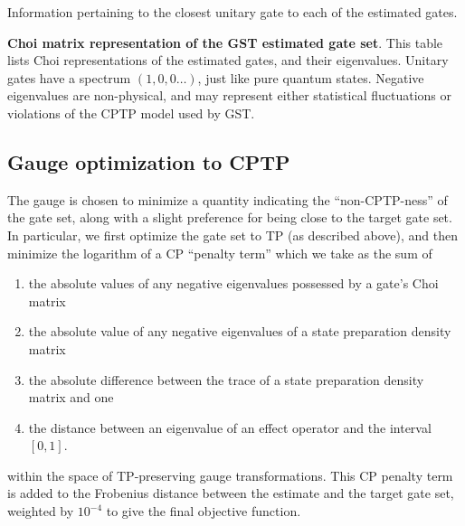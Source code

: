 {\begin{table}[h]
\begin{center}
\caption{Information pertaining to the closest unitary gate to each of the estimated gates.\label{bestTPGatesetClosestUnitaryTable}}
\end{center}
\end{table}


\begin{table}[h]
\begin{center}
\caption{\textbf{Choi matrix representation of the GST estimated gate set}.  This table lists Choi representations of the estimated gates, and their eigenvalues.  Unitary gates have a spectrum $(1,0,0\ldots)$, just like pure quantum states.  Negative eigenvalues are non-physical, and may represent either statistical fluctuations or violations of the CPTP model used by GST.\label{bestTPGatesetChoiTable}}
\end{center}
\end{table}

\clearpage

\subsection{Gauge optimization to CPTP}
The gauge is chosen to minimize a quantity indicating the ``non-CPTP-ness'' of the gate set, along with a slight preference for being close to the target gate set.  In particular, we first optimize the gate set to TP (as described above), and then minimize the logarithm of a CP ``penalty term'' which we take as the sum of
\begin{enumerate}
\item the absolute values of any negative eigenvalues possessed by a gate's Choi matrix
\item the absolute value of any negative eigenvalues of a state preparation density matrix
\item the absolute difference between the trace of a state preparation density matrix and one
\item the distance between an eigenvalue of an effect operator and the interval $[0,1]$.
\end{enumerate}
within the space of TP-preserving gauge transformations.  This CP penalty term is added to the Frobenius distance between the estimate and the target gate set, weighted by $10^{-4}$ to give the final objective function.

}
